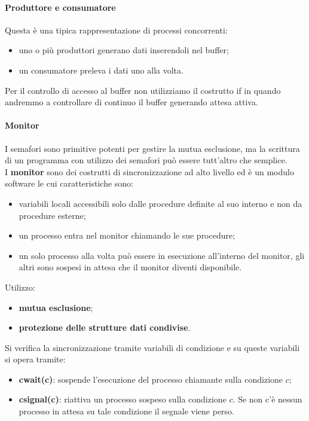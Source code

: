 \documentclass[12pt, letterpaper]{report}
\begin{document}
	\paragraph{Produttore e consumatore} Questa è una tipica rappresentazione di processi concorrenti:
	\begin{itemize}
		\item uno o più produttori generano dati inserendoli nel buffer;
		\item un consumatore preleva i dati uno alla volta.
	\end{itemize}
	Per il controllo di accesso al buffer non utilizziamo il costrutto if in quando andremmo a controllare di continuo il buffer generando attesa attiva.
	\paragraph{Monitor}
	I semafori sono primitive potenti per gestire la mutua esclusione, ma la scrittura di un programma con utilizzo dei semafori può essere tutt'altro che semplice. \\
	I \textbf{monitor} sono dei costrutti di sincronizzazione ad alto livello ed è un modulo software le cui caratteristiche sono:
	\begin{itemize}
		\item variabili locali accessibili solo dalle procedure definite al suo interno e non da procedure esterne;
		\item un processo entra nel monitor chiamando le sue procedure;
		\item un solo processo alla volta può essere in esecuzione all'interno del monitor, gli altri sono sospesi in attesa che il monitor diventi disponibile.
	\end{itemize}
	Utilizzo:
	\begin{itemize}
		\item \textbf{mutua esclusione};
		\item \textbf{protezione delle strutture dati condivise}.
	\end{itemize}
	Si verifica la sincronizzazione tramite variabili di condizione e su queste variabili si opera tramite:
	\begin{itemize}
		\item \textbf{cwait(c)}: sospende l'esecuzione del processo chiamante sulla condizione $c$;
		\item \textbf{csignal(c)}: riattiva un processo sospeso sulla condizione $c$. Se non c'è nessun processo in attesa su tale condizione il segnale viene perso.
	\end{itemize}
\end{document}
